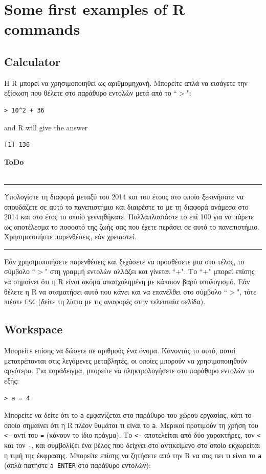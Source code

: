 \documentclass[a4paper,11pt,twocolumn,tablecaptionabove]{scrartcl}
\makeatletter
\newenvironment{ToDo} {%
  \begin{flushright}
    \hfill
    \begin{minipage}{0.95\columnwidth}         %
    \textsf{\textbf{ToDo}} \\
      \vspace{-0.85cm}\\
      {\color{Gray}\rule[-0.1cm]{\columnwidth}{1.5pt}}} { %
      {\color{Gray} \rule[0.3cm]{\columnwidth}{1.5pt}}
    \end{minipage}
    \vspace{1em}
  \end{flushright}
  }
\let\SF@@footnote\footnote
\def\footnote{\ifx\protect\@typeset@protect
 \expandafter\SF@@footnote
 \else
 \expandafter\SF@gobble@opt
 \fi
}
\edef\SF@gobble@opt{\noexpand\protect
 \expandafter\noexpand\csname SF@gobble@opt \endcsname}
\makeatother
\begin{document}
\section{Some first examples of R commands}

\subsection{Calculator}

Η R μπορεί να χρησιμοποιηθεί ως αριθμομηχανή. Μπορείτε απλά να εισάγετε την εξίσωση που θέλετε στο
παράθυρο εντολών μετά από το ``$>$":
\begin{Verbatim}[frame=single,gobble=0]
> 10^2 + 36
\end{Verbatim}
and R will give the answer
\begin{Verbatim}[frame=single,gobble=0]
[1] 136
\end{Verbatim}

\begin{ToDo}
Υπολογίστε τη διαφορά μεταξύ του 2014 και του έτους στο οποίο ξεκινήσατε να σπουδάζετε σε αυτό το πανεπιστήμιο
και διαιρέστε το με τη διαφορά ανάμεσα στο 2014 και στο έτος το οποίο γεννηθήκατε. Πολλαπλασιάστε το επί 100 για
να πάρετε ως αποτέλεσμα το ποσοστό της ζωής σας που έχετε περάσει σε αυτό το πανεπιστήμιο. Χρησιμοποιήστε
παρενθέσεις, εάν χρειαστεί. \\
\end{ToDo}

Εάν χρησιμοποιήσετε παρενθέσεις και ξεχάσετε να προσθέσετε μια στο τέλος, το σύμβολο ``$>$" στη γραμμή
εντολών αλλάζει και γίνεται ``+". Το ``+" μπορεί επίσης να σημαίνει ότι η R είναι ακόμα απασχολημένη με 
κάποιον βαρύ υπολογισμό. Εάν θέλετε η R να σταματήσει αυτό που κάνει και να επανέλθει στο σύμβολο ``$>$", 
τότε πιέστε \texttt{ESC} (δείτε τη λίστα με τις αναφορές στην τελευταία σελίδα). 

\subsection{Workspace}

Μπορείτε επίσης να δώσετε σε αριθμούς ένα όνομα. Κάνοντάς το αυτό, αυτοί μετατρέπονται στις λεγόμενες μεταβλητές,
οι οποίες μπορούν να χρησιμοποιηθούν αργότερα. Για παράδειγμα, μπορείτε να πληκτρολογήσετε στο παράθυρο εντολών
το εξής: 
\begin{Verbatim}[frame=single,gobble=0]
> a = 4
\end{Verbatim}
Μπορείτε να δείτε ότι το \texttt{a} εμφανίζεται στο παράθυρο του χώρου εργασίας, κάτι το οποίο σημαίνει ότι η
R πλέον θυμάται τι είναι το \texttt{a}.\footnote{Μερικοί προτιμούν τη χρήση του \texttt{<-} αντί του
\texttt{=} (κάνουν το ίδιο πράγμα). Το \texttt{<-} αποτελείται από δύο χαρακτήρες, τον \texttt{<} και τον
\texttt{-}, και συμβολίζει ένα βέλος που δείχνει στο αντικείμενο στο οποίο εκχωρείται η τιμή της έκφρασης.} 
Μπορείτε επίσης να ζητήσετε από την R να σας πει τι είναι το \texttt{a} (απλά πατήστε \texttt{a ENTER} στο
παράθυρο εντολών):
\end{document}

